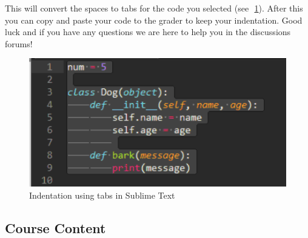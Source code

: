 \documentclass{article}
\newenvironment{answer}{}{}
\newenvironment{faq}{\begin{description}}{\end{description}}
\begin{document}
\begin{faq}
\begin{answer}
			This will convert the spaces to tabs for the code you selected (see~\figurename\,\textcolor{blue}{\ref{Indentation using tabs in Sublime Text}}). After this you can copy and paste your code to the grader to keep your indentation. Good luck and
			if you have any questions we are here to help you in the discussions forums!
			
			\begin{figure}[htb]
				\centering
				\caption{Indentation using tabs in Sublime Text} \label{Indentation using tabs in Sublime Text}
				\includegraphics{spaces_indentation}
			\end{figure}
		\end{answer}
	\end{faq}
	
	\clearpage
	
	\subsection*{\LARGE Course Content}
	
\end{document}
